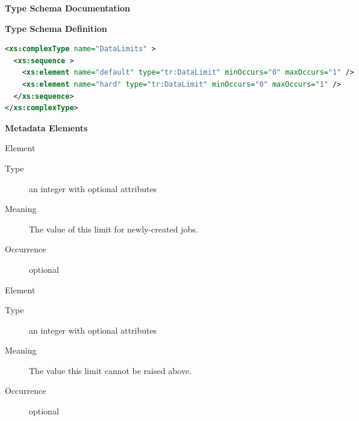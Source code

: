 \documentclass{ivoa}
\begin{document}
\begingroup
      	\renewcommand*\descriptionlabel[1]{%
      	\hbox to 5.5em{\emph{#1}\hfil}}
      	\vspace{2ex}\noindent\textbf{ Type Schema Documentation}


\vspace{1ex}\noindent\textbf{ Type Schema Definition}

\begin{lstlisting}[language=XML,basicstyle=\footnotesize]
<xs:complexType name="DataLimits" >
  <xs:sequence >
    <xs:element name="default" type="tr:DataLimit" minOccurs="0" maxOccurs="1" />
    <xs:element name="hard" type="tr:DataLimit" minOccurs="0" maxOccurs="1" />
  </xs:sequence>
</xs:complexType>
\end{lstlisting}

\vspace{0.5ex}\noindent\textbf{ Metadata Elements}

\begingroup\small\begin{bigdescription}\item[Element \xmlel{default}]
\begin{description}
\item[Type] an integer with optional attributes
\item[Meaning] 
          The value of this limit for newly-created jobs.
          
\item[Occurrence] optional

\end{description}
\item[Element \xmlel{hard}]
\begin{description}
\item[Type] an integer with optional attributes
\item[Meaning] 
          The value this limit cannot be raised above.
          
\item[Occurrence] optional

\end{description}


\end{bigdescription}\endgroup
\end{document}
